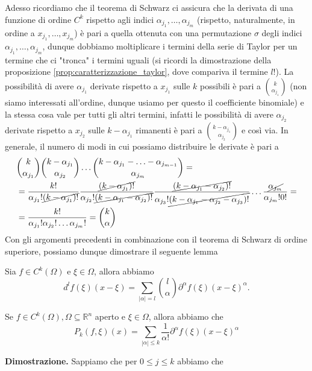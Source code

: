 Adesso ricordiamo che il teorema di Schwarz ci assicura che la derivata di una funzione di ordine $C^k$ rispetto agli indici $\alpha_{j_1}, \ldots, \alpha_{j_m}$ (rispetto, naturalmente, in ordine a $x_{j_1}, \ldots, x_{j_m}$) è pari a quella ottenuta con una permutazione $\sigma$ degli indici $\alpha_{j_1}, \ldots, \alpha_{j_m}$, dunque dobbiamo moltiplicare i termini della serie di Taylor per un termine che ci "tronca" i termini uguali (si ricordi la dimostrazione della proposizione \ref{prop:caratterizzazione_taylor}, dove compariva il termine $l!$). La possibilità di avere $\alpha_{j_1}$ derivate rispetto a $x_{j_1}$ sulle $k$ possibili è pari a $\binom{k}{\alpha_{j_1}}$ (non siamo interessati all'ordine, dunque usiamo per questo il coefficiente binomiale) e la stessa cosa vale per tutti gli altri termini, infatti
le possibilità di avere $\alpha_{j_2}$ derivate rispetto a $x_{j_2}$ sulle $k-\alpha_{j_1}$ rimanenti è pari a $\binom{k - \alpha_{j_1}}{\alpha_{j_2}}$ e così via. In generale, il numero di modi in cui possiamo distribuire le derivate è pari a
%
\begin{equation}\begin{aligned}
&\binom{k}{\alpha_{j_1}} \binom{k - \alpha_{j_1}}{\alpha_{j_2}} \ldots \binom{k - \alpha_{j_1} - \ldots - \alpha_{j_{m-1}}}{\alpha_{j_m}} = \\
& = \frac{k!}{\alpha_{j_1}! \cancel{(k - \alpha_{j_1})!}} \frac{\cancel{(k-\alpha_{j_1})!}}{\alpha_{j_2}!\cancel{(k - \alpha_{j_1} - \alpha_{j_2})!}} \frac{\cancel{(k - \alpha_{j_1} - \alpha_{j_2})!}}{\alpha_{j_3}! \cancel{(k - \alpha_{j_1} - \alpha_{j_2} - \alpha_{j_3})!}} \ldots \frac{\cancel{\alpha_{j_m}}}{\alpha_{j_m}! 0!} = \\
&= \frac{k!}{\alpha_{j_1}! \alpha_{j_2}! \ldots \alpha_{j_m}!} = \binom{k}{\alpha}
\end{aligned}\end{equation}
%
Con gli argomenti precedenti in combinazione con il teorema di Schwarz di ordine superiore, possiamo dunque dimostrare il seguente lemma
%
\begin{lemma}
	Sia $f \in C^k(\Omega)$ e $\xi \in \Omega$, allora abbiamo
	$$
	d^l f(\xi)(x - \xi) = \sum_{|\alpha|=l} \binom{l}{\alpha} \partial^{\alpha} f(\xi) (x - \xi)^{\alpha}.
	$$
\end{lemma}
%
\begin{prop}
	Se $f \in C^k(\Omega), \Omega \subseteq \mathbb{R}^n$ aperto e $\xi \in \Omega$, allora abbiamo che
	$$
	P_k(f, \xi)(x) = \sum_{|\alpha| \leq k} \frac{1}{\alpha!} \partial^{\alpha} f(\xi) (x - \xi)^{\alpha}
	$$
\end{prop}
%
\noindent \textbf{Dimostrazione. }
	Sappiamo che per $0 \leq j \leq k$ abbiamo che
	
